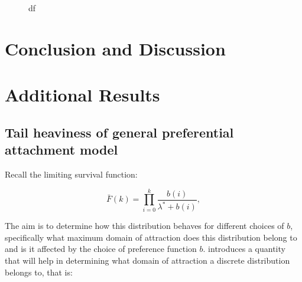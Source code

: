 \documentclass[
  sn-basic,
]{sn-jnl}
\theoremstyle{plain}
\theoremstyle{remark}
\begin{document}
\begin{figure}[H]


\caption{\label{fig-pars}df}

\end{figure}%

\section{Conclusion and Discussion}\label{conclusion-and-discussion}

\section{Additional Results}\label{additional-results}

\subsection{Tail heaviness of general preferential attachment
model}\label{tail-heaviness-of-general-preferential-attachment-model}

Recall the limiting survival function:

\[
\bar F(k) = \prod_{i=0}^k \frac{b(i)}{\lambda^*+b(i)},
\]

The aim is to determine how this distribution behaves for different
choices of \(b\), specifically what maximum domain of attraction does
this distribution belong to and is it affected by the choice of
preference function \(b\). \citet{shimura12} introduces a quantity that
will help in determining what domain of attraction a discrete
distribution belongs to, that is:
\end{document}
